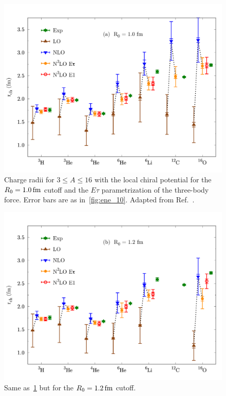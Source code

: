 \documentclass[aps,prc,twocolumn,superscriptaddress,showpacs,floatfix,nofootinbib]{revtex4-1}
\begin{document}
\begin{figure}[htb]
\includegraphics[width=\linewidth]{rch_10.pdf}
\caption[]{Charge radii for $3\le A\le16$ with the local chiral potential 
for the $R_0=1.0\,\rm fm$ cutoff and the $E\tau$ parametrization of the three-body force. 
Error bars are as in~\cref{fig:ene_10}. Adapted from Ref.~\cite{Lonardoni:2017afdmc}.}
\label{fig:rch_10}
\end{figure}

\begin{figure}[htb]
\includegraphics[width=\linewidth]{rch_12.pdf}
\caption[]{Same as~\cref{fig:rch_10} but for the $R_0=1.2\,\rm fm$ cutoff.}
\label{fig:rch_12}
\end{figure}
\end{document}
